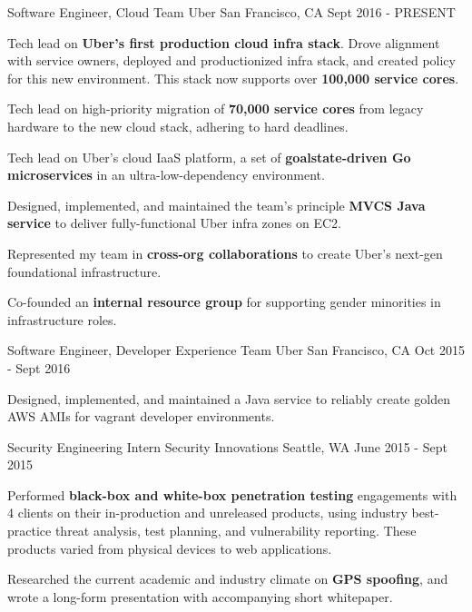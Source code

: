
\begin{cventries}
  \cventry
    {Software Engineer, Cloud Team} %
    {Uber} %
    {San Francisco, CA} %
    {Sept 2016 - PRESENT} %
    {
      \begin{cvitems} %
        \item {Tech lead on \textbf{Uber's first production cloud infra stack}. Drove alignment with service owners, deployed and productionized infra stack, and created policy for this new environment.  This stack now supports over \textbf{100,000 service cores}.}
        \item {Tech lead on high-priority migration of \textbf{70,000 service cores} from legacy hardware to the new cloud stack, adhering to hard deadlines.}
        \item {Tech lead on Uber's cloud IaaS platform, a set of \textbf{goalstate-driven Go microservices} in an ultra-low-dependency environment.}
        \item {Designed, implemented, and maintained the team's principle \textbf{MVCS Java service} to deliver fully-functional Uber infra zones on EC2.}
        \item {Represented my team in \textbf{cross-org collaborations} to create Uber's next-gen foundational infrastructure.}
        \item {Co-founded an \textbf{internal resource group} for supporting gender minorities in infrastructure roles.}
      \end{cvitems}
    }
    \cventry
    {Software Engineer, Developer Experience Team} %
    {Uber} %
    {San Francisco, CA} %
    {Oct 2015 - Sept 2016} %
    {
      \begin{cvitems} %
        \item {Designed, implemented, and maintained a Java service to reliably create golden AWS AMIs for vagrant developer environments.}
      \end{cvitems}
    }
    
  \cventry
    {Security Engineering Intern} %
    {Security Innovations} %
    {Seattle, WA} %
    {June 2015 - Sept 2015} %
    {
      \begin{cvitems} %
        \item {Performed \textbf{black-box and white-box penetration testing} engagements with 4 clients on their in-production and unreleased products, using industry best-practice threat analysis, test planning, and vulnerability reporting. These products varied from physical devices to web applications.}
        \item {Researched the current academic and industry climate on \textbf{GPS spoofing}, and wrote a long-form presentation with accompanying short whitepaper.}
      \end{cvitems}
    }


\end{cventries}

